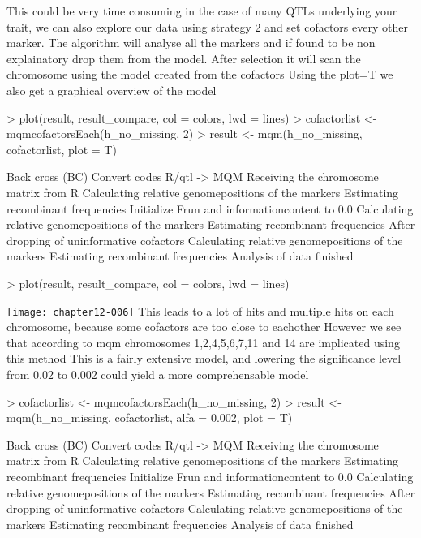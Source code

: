 \documentclass[a4paper]{article}
\begin{document}
This could be very time consuming in the case of many QTLs underlying your trait,
we can also explore our data using strategy 2 and set cofactors every other marker. The algorithm will analyse
all the markers and if found to be non explainatory drop them from the model. After
selection it will scan the chromosome using the model created from the cofactors
Using the plot=T we also get a graphical overview of the model
\begin{Schunk}
\begin{Sinput}
> plot(result, result_compare, col = colors, lwd = lines)
> cofactorlist <- mqmcofactorsEach(h_no_missing, 2)
> result <- mqm(h_no_missing, cofactorlist, plot = T)
\end{Sinput}
\begin{Soutput}
Back cross (BC)
Convert codes R/qtl -> MQM
Receiving the chromosome matrix from R
Calculating relative genomepositions of the markers
Estimating recombinant frequencies
Initialize Frun and informationcontent to 0.0
Calculating relative genomepositions of the markers
Estimating recombinant frequencies
After dropping of uninformative cofactors
Calculating relative genomepositions of the markers
Estimating recombinant frequencies
Analysis of data finished
\end{Soutput}
\begin{Sinput}
> plot(result, result_compare, col = colors, lwd = lines)
\end{Sinput}
\end{Schunk}
\texttt{[image: chapter12-006]}
This leads to a lot of hits and multiple hits on each chromosome, because some cofactors are too close to eachother
However we see that according to mqm chromosomes 1,2,4,5,6,7,11 and 14 are implicated using this method
This is a fairly extensive model, and lowering the significance level from 0.02 to 0.002 could yield a more comprehensable model
\begin{Schunk}
\begin{Sinput}
> cofactorlist <- mqmcofactorsEach(h_no_missing, 2)
> result <- mqm(h_no_missing, cofactorlist, alfa = 0.002, plot = T)
\end{Sinput}
\begin{Soutput}
Back cross (BC)
Convert codes R/qtl -> MQM
Receiving the chromosome matrix from R
Calculating relative genomepositions of the markers
Estimating recombinant frequencies
Initialize Frun and informationcontent to 0.0
Calculating relative genomepositions of the markers
Estimating recombinant frequencies
After dropping of uninformative cofactors
Calculating relative genomepositions of the markers
Estimating recombinant frequencies
Analysis of data finished
\end{Soutput}
\end{Schunk}
\end{document}
